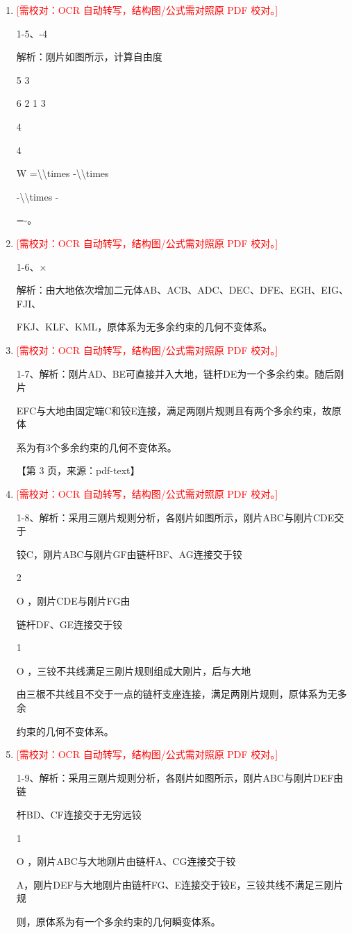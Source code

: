 \documentclass[UTF8,12pt,a4paper,openany]{ctexbook}
\newcommand{\TODO}[1]{\textcolor{red}{[需校对：#1]}}
\begin{document}
\begin{enumerate}[label=\textbf{\arabic*.},leftmargin=2em]
\item \TODO{OCR 自动转写，结构图/公式需对照原 PDF 校对。}\par 1-5、-4\par 解析：刚片如图所示，计算自由度\par 5 3\par 6 2 1 3\par 4\par 4\par W =\textbackslash{}\textbackslash{}times -\textbackslash{}\textbackslash{}times\par -\textbackslash{}\textbackslash{}times -\par =-。
\item \TODO{OCR 自动转写，结构图/公式需对照原 PDF 校对。}\par 1-6、×\par 解析：由大地依次增加二元体AB、ACB、ADC、DEC、DFE、EGH、EIG、FJI、\par FKJ、KLF、KML，原体系为无多余约束的几何不变体系。
\item \TODO{OCR 自动转写，结构图/公式需对照原 PDF 校对。}\par 1-7、解析：刚片AD、BE可直接并入大地，链杆DE为一个多余约束。随后刚片\par EFC与大地由固定端C和铰E连接，满足两刚片规则且有两个多余约束，故原体\par 系为有3个多余约束的几何不变体系。\par \par 【第 3 页，来源：pdf-text】
\item \TODO{OCR 自动转写，结构图/公式需对照原 PDF 校对。}\par 1-8、解析：采用三刚片规则分析，各刚片如图所示，刚片ABC与刚片CDE交于\par 铰C，刚片ABC与刚片GF由链杆BF、AG连接交于铰\par 2\par O ，刚片CDE与刚片FG由\par 链杆DF、GE连接交于铰\par 1\par O ，三铰不共线满足三刚片规则组成大刚片，后与大地\par 由三根不共线且不交于一点的链杆支座连接，满足两刚片规则，原体系为无多余\par 约束的几何不变体系。
\item \TODO{OCR 自动转写，结构图/公式需对照原 PDF 校对。}\par 1-9、解析：采用三刚片规则分析，各刚片如图所示，刚片ABC与刚片DEF由链\par 杆BD、CF连接交于无穷远铰\par 1\par O ，刚片ABC与大地刚片由链杆A、CG连接交于铰\par A，刚片DEF与大地刚片由链杆FG、E连接交于铰E，三铰共线不满足三刚片规\par 则，原体系为有一个多余约束的几何瞬变体系。

\end{enumerate}
\end{document}
